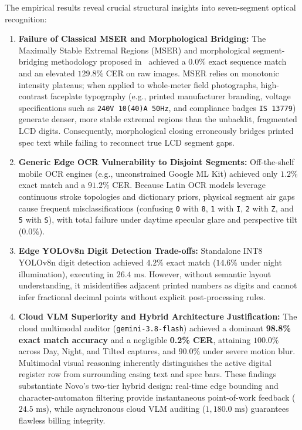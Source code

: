 \documentclass[12pt,a4paper,oneside]{report}
\begin{document}
The empirical results reveal crucial structural insights into seven-segment optical recognition:
\begin{enumerate}
    \item \textbf{Failure of Classical MSER and Morphological Bridging:} The Maximally Stable Extremal Regions (MSER) and morphological segment-bridging methodology proposed in~\cite{kanagarathinam2020text} achieved a $0.0\%$ exact sequence match and an elevated $129.8\%$ CER on raw images. MSER relies on monotonic intensity plateaus; when applied to whole-meter field photographs, high-contrast faceplate typography (e.g., printed manufacturer branding, voltage specifications such as \texttt{240V 10(40)A 50Hz}, and compliance badges \texttt{IS 13779}) generate denser, more stable extremal regions than the unbacklit, fragmented LCD digits. Consequently, morphological closing erroneously bridges printed spec text while failing to reconnect true LCD segment gaps.
    \item \textbf{Generic Edge OCR Vulnerability to Disjoint Segments:} Off-the-shelf mobile OCR engines (e.g., unconstrained Google ML Kit) achieved only $1.2\%$ exact match and a $91.2\%$ CER. Because Latin OCR models leverage continuous stroke topologies and dictionary priors, physical segment air gaps cause frequent misclassifications (confusing \texttt{0} with \texttt{8}, \texttt{1} with \texttt{I}, \texttt{2} with \texttt{Z}, and \texttt{5} with \texttt{S}), with total failure under daytime specular glare and perspective tilt ($0.0\%$).
    \item \textbf{Edge YOLOv8n Digit Detection Trade-offs:} Standalone INT8 YOLOv8n digit detection achieved $4.2\%$ exact match ($14.6\%$ under night illumination), executing in $26.4\text{~ms}$. However, without semantic layout understanding, it misidentifies adjacent printed numbers as digits and cannot infer fractional decimal points without explicit post-processing rules.
    \item \textbf{Cloud VLM Superiority and Hybrid Architecture Justification:} The cloud multimodal auditor (\texttt{gemini-3.8-flash}) achieved a dominant \textbf{98.8\% exact match accuracy} and a negligible \textbf{0.2\% CER}, attaining $100.0\%$ across Day, Night, and Tilted captures, and $90.0\%$ under severe motion blur. Multimodal visual reasoning inherently distinguishes the active digital register row from surrounding casing text and spec bars. These findings substantiate Novo's two-tier hybrid design: real-time edge bounding and character-automaton filtering provide instantaneous point-of-work feedback ($24.5\text{~ms}$), while asynchronous cloud VLM auditing ($1,180.0\text{~ms}$) guarantees flawless billing integrity.
\end{enumerate}
\end{document}
